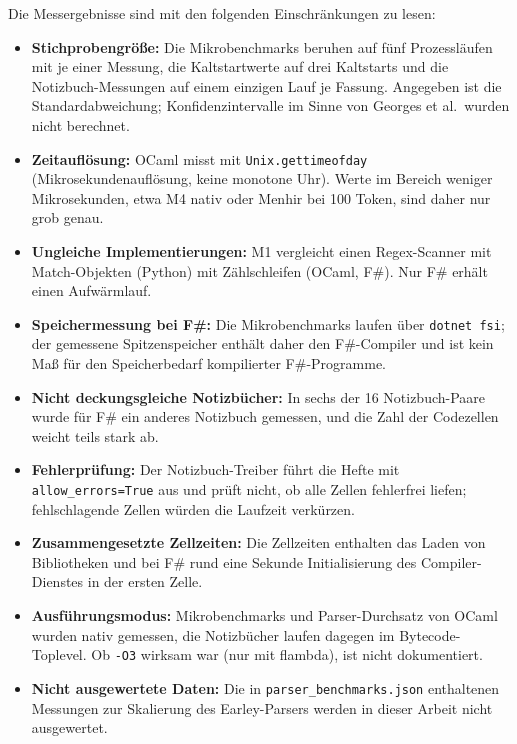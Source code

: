 Die Messergebnisse sind mit den folgenden Einschränkungen zu lesen:
\begin{itemize}
  \item \textbf{Stichprobengröße:} Die Mikrobenchmarks beruhen auf fünf Prozessläufen mit je einer Messung, die Kaltstartwerte auf drei Kaltstarts und die Notizbuch-Messungen auf einem einzigen Lauf je Fassung.
  Angegeben ist die Standardabweichung; Konfidenzintervalle im Sinne von Georges et al.\ wurden nicht berechnet.
  \item \textbf{Zeitauflösung:} OCaml misst mit \texttt{Unix.gettimeofday} (Mikrosekundenauflösung, keine monotone Uhr).
  Werte im Bereich weniger Mikrosekunden, etwa M4 nativ oder Menhir bei 100 Token, sind daher nur grob genau.
  \item \textbf{Ungleiche Implementierungen:} M1 vergleicht einen Regex-Scanner mit Match-Objekten (Python) mit Zählschleifen (OCaml, F\#).
  Nur F\# erhält einen Aufwärmlauf.
  \item \textbf{Speichermessung bei F\#:} Die Mikrobenchmarks laufen über \texttt{dotnet fsi}; der gemessene Spitzenspeicher enthält daher den F\#-Compiler und ist kein Maß für den Speicherbedarf kompilierter F\#-Programme.
  \item \textbf{Nicht deckungsgleiche Notizbücher:} In sechs der 16 Notizbuch-Paare wurde für F\# ein anderes Notizbuch gemessen, und die Zahl der Codezellen weicht teils stark ab.
  \item \textbf{Fehlerprüfung:} Der Notizbuch-Treiber führt die Hefte mit \texttt{allow\_errors=True} aus und prüft nicht, ob alle Zellen fehlerfrei liefen; fehlschlagende Zellen würden die Laufzeit verkürzen.
  \item \textbf{Zusammengesetzte Zellzeiten:} Die Zellzeiten enthalten das Laden von Bibliotheken und bei F\# rund eine Sekunde Initialisierung des Compiler-Dienstes in der ersten Zelle.
  \item \textbf{Ausführungsmodus:} Mikrobenchmarks und Parser-Durchsatz von OCaml wurden nativ gemessen, die Notizbücher laufen dagegen im Bytecode-Toplevel.
  Ob \texttt{-O3} wirksam war (nur mit flambda), ist nicht dokumentiert.
  \item \textbf{Nicht ausgewertete Daten:} Die in \texttt{parser\_benchmarks.json} enthaltenen Messungen zur Skalierung des Earley-Parsers werden in dieser Arbeit nicht ausgewertet.
\end{itemize}
